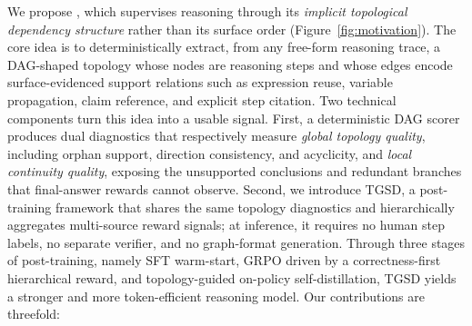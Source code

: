 We propose \textsc{\method}, which supervises reasoning through its \emph{implicit topological dependency structure} rather than its surface order (Figure~\ref{fig:motivation}). The core idea is to deterministically extract, from any free-form reasoning trace, a DAG-shaped topology whose nodes are reasoning steps and whose edges encode surface-evidenced support relations such as expression reuse, variable propagation, claim reference, and explicit step citation. Two technical components turn this idea into a usable signal. First, a deterministic DAG scorer produces dual diagnostics that respectively measure \emph{global topology quality}, including orphan support, direction consistency, and acyclicity, and \emph{local continuity quality}, exposing the unsupported conclusions and redundant branches that final-answer rewards cannot observe. Second, we introduce \textsc{TGSD}, a post-training framework that shares the same topology diagnostics and hierarchically aggregates multi-source reward signals; at inference, it requires no human step labels, no separate verifier, and no graph-format generation. Through three stages of post-training, namely SFT warm-start, GRPO driven by a correctness-first hierarchical reward, and topology-guided on-policy self-distillation, \textsc{TGSD} yields a stronger and more token-efficient reasoning model.
Our contributions are threefold:

